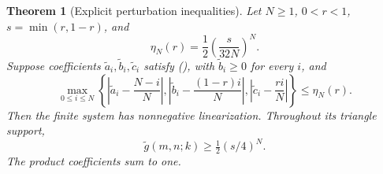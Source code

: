 \documentclass[twoside,10pt]{article}
\numberwithin{equation}{section}
\theoremstyle{slbody}
\newtheorem{theorem}{Theorem}[section]
\theoremstyle{definition}
\theoremstyle{remark}
\renewcommand{\eqref}[1]{\textup{{\normalfont(\oldstylenums{\ref{#1}}}\normalfont)}}
\begin{document}
\begin{theorem}[Explicit perturbation inequalities]\label{thm:perturbation}
Let $N\geq1$, $0<r<1$, $s=\min(r,1-r)$, and
\begin{equation}\label{eq:radius}
\eta_N(r)=\frac12\left(\frac{s}{32N}\right)^N.
\end{equation}
Suppose coefficients $\widetilde a_i,\widetilde b_i,\widetilde c_i$ satisfy \eqref{eq:basic}, with $\widetilde b_i\geq0$ for every $i$, and
\begin{equation}\label{eq:closeness}
\max_{0\leq i\leq N}\left\{
\left|\widetilde a_i-\frac{N-i}{N}\right|,
\left|\widetilde b_i-\frac{(1-r)i}{N}\right|,
\left|\widetilde c_i-\frac{ri}{N}\right|\right\}\leq\eta_N(r).
\end{equation}
Then the finite system has nonnegative linearization. Throughout its triangle support,
\[
\widetilde g(m,n;k)\geq\tfrac12(s/4)^N.
\]
The product coefficients sum to one.
\end{theorem}
\end{document}
